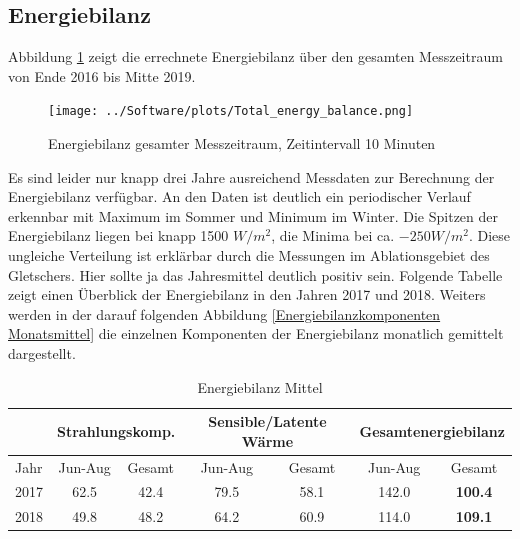 \documentclass[12pt,a4paper]{article}
\begin{document}
\subsection{Energiebilanz}
Abbildung \ref{fig:Energiebilanz gesamter Messzeitraum, Zeitintervall 10 Minuten} zeigt die errechnete Energiebilanz über den gesamten Messzeitraum von Ende 2016 bis Mitte 2019. 

\begin{figure}[H]
\centering
\texttt{[image: ../Software/plots/Total\_energy\_balance.png]}
\caption{Energiebilanz gesamter Messzeitraum, Zeitintervall 10 Minuten}
\label{fig:Energiebilanz gesamter Messzeitraum, Zeitintervall 10 Minuten}
\end{figure}

Es sind leider nur knapp drei Jahre ausreichend Messdaten zur Berechnung der Energiebilanz verfügbar. An den Daten ist deutlich ein periodischer Verlauf erkennbar mit Maximum im Sommer und Minimum im Winter. Die Spitzen der Energiebilanz liegen bei knapp 1500 $W/m^2$, die Minima bei ca. $-250 W/m^2$. Diese ungleiche Verteilung ist erklärbar durch die Messungen im Ablationsgebiet des Gletschers. Hier sollte ja das Jahresmittel deutlich positiv sein. Folgende Tabelle zeigt einen Überblick der Energiebilanz in den Jahren 2017 und 2018. Weiters werden in der darauf folgenden Abbildung \ref{Energiebilanzkomponenten Monatsmittel} die einzelnen Komponenten der Energiebilanz monatlich gemittelt dargestellt.

\begin{table}[H]
\centering
{} 
\caption{Energiebilanz Mittel}
\label{tab:Energiebilanz Mittel}
\begin{tabular}{|l|cc|cc|cc|}
\hline
     & \multicolumn{2}{c|}{\textbf{Strahlungskomp}.} & \multicolumn{2}{c|}{\textbf{Sensible/Latente Wärme}} & \multicolumn{2}{c|}{\textbf{Gesamtenergiebilanz}} \\ \hline
Jahr & Jun-Aug           & Gesamt           & Jun-Aug               & Gesamt              & Jun-Aug         & Gesamt                 \\ \hline
2017 & 62.5              & 42.4             & 79.5                  & 58.1                & 142.0           & \textbf{100.4}         \\ \hline
2018 & 49.8              & 48.2             & 64.2                  & 60.9                & 114.0           & \textbf{109.1}         \\ \hline
\end{tabular}
\end{table}
\end{document}
